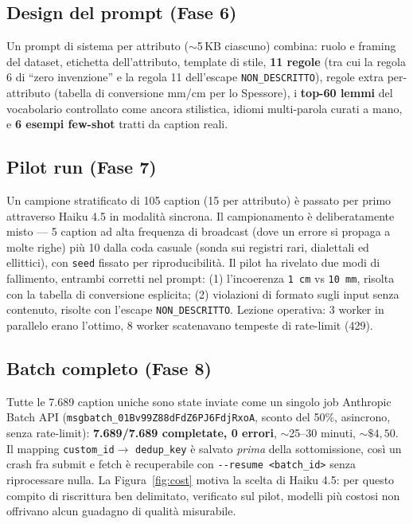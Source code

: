 \documentclass[11pt,a4paper]{article}
\begin{document}
\subsection{Design del prompt (Fase 6)}
Un prompt di sistema per attributo ($\sim$5\,KB ciascuno) combina: ruolo e
framing del dataset, etichetta dell'attributo, template di stile,
\textbf{11 regole} (tra cui la regola 6 di ``zero invenzione'' e la regola 11
dell'escape \texttt{NON\_DESCRITTO}), regole extra per-attributo (tabella di
conversione mm/cm per lo Spessore), i \textbf{top-60 lemmi} del vocabolario
controllato come ancora stilistica, idiomi multi-parola curati a mano, e
\textbf{6 esempi few-shot} tratti da caption reali.

\subsection{Pilot run (Fase 7)}
Un campione stratificato di 105 caption (15 per attributo) \`e passato per
primo attraverso Haiku 4.5 in modalit\`a sincrona. Il campionamento \`e
deliberatamente misto --- 5 caption ad alta frequenza di broadcast (dove un
errore si propaga a molte righe) pi\`u 10 dalla coda casuale (sonda sui registri
rari, dialettali ed ellittici), con \texttt{seed} fissato per riproducibilit\`a.
Il pilot ha rivelato due modi di fallimento, entrambi corretti nel prompt: (1) l'incoerenza
\texttt{1 cm} vs \texttt{10 mm}, risolta con la tabella di conversione
esplicita; (2) violazioni di formato sugli input senza contenuto, risolte con
l'escape \texttt{NON\_DESCRITTO}. Lezione operativa: 3 worker in parallelo
erano l'ottimo, 8 worker scatenavano tempeste di rate-limit (429).

\subsection{Batch completo (Fase 8)}
Tutte le 7.689 caption uniche sono state inviate come un singolo job Anthropic
Batch API (\texttt{msgbatch\_01Bv99Z88dFdZ6PJ6FdjRxoA}, sconto del 50\%,
asincrono, senza rate-limit): \textbf{7.689/7.689 completate, 0 errori},
$\sim$25--30 minuti, $\sim\$4{,}50$. Il mapping \texttt{custom\_id}$\rightarrow$
\texttt{dedup\_key} \`e salvato \emph{prima} della sottomissione, cos\`i un
crash fra submit e fetch \`e recuperabile con \texttt{-{}-resume <batch\_id>}
senza riprocessare nulla. La Figura~\ref{fig:cost} motiva la scelta di Haiku
4.5: per questo compito di riscrittura ben delimitato, verificato sul pilot,
modelli pi\`u costosi non offrivano alcun guadagno di qualit\`a misurabile.
\end{document}
